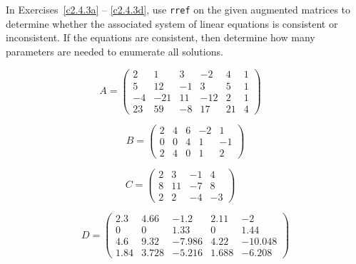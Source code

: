 \noindent In Exercises~\ref{c2.4.3a} -- \ref{c2.4.3d}, use {\tt rref} on
the given augmented matrices to determine whether the associated system of
linear equations is consistent or inconsistent.  If the equations are
consistent, then determine how many parameters are needed to enumerate
all solutions.
\begin{exercise} \label{c2.4.3a}
\begin{equation*}
A = \left(\begin{array}{rrrrr|r}
2 & 1 & 3 & -2 & 4 & 1 \\
5 & 12 & -1 & 3 & 5 & 1 \\
-4  &  -21 &    11  &  -12  &    2  &    1  \\
23  &  59  &  -8   & 17  &  21  &   4
\end{array}\right) \quad
\end{equation*}
\end{exercise}
\begin{exercise} \label{c2.4.3b}
\begin{equation*}
B = \left(\begin{array}{rrrr|r}
     2   &  4  & 6  &  -2   &  1 \\
     0   &  0   &  4  &   1  &  -1\\
     2   &  4   &  0   &  1  &   2
\end{array}\right)\end{equation*}
\end{exercise}
\begin{exercise} \label{c2.4.3c}
\begin{equation*}
C = \left(\begin{array}{rrr|r}
     2  &   3  &  -1  &   4 \\
     8  &  11  &  -7  &   8\\
     2  &   2  &  -4  &  -3
\end{array}\right) \quad
\end{equation*}
\end{exercise}
\begin{exercise} \label{c2.4.3d}
\begin{equation*}
D = \left(\begin{array}{rrrr|r}
    2.3 &  4.66  & -1.2   & 2.11  & -2 \\
         0  &   0  &  1.33  &   0  &  1.44\\
    4.6  &  9.32  & -7.986   & 4.22  & -10.048\\
    1.84  &  3.728 & -5.216   & 1.688 & -6.208
\end{array}\right)
\end{equation*}
\end{exercise}

